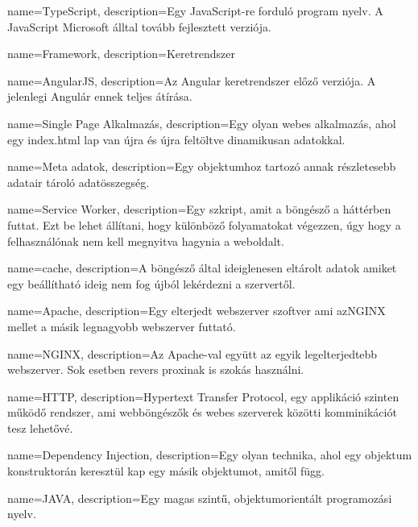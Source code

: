 {
        name=TypeScript,
        description={Egy JavaScript-re forduló program nyelv. A JavaScript Microsoft álltal tovább fejlesztett verziója.}
}

{
        name=Framework,
        description={Keretrendszer}
}

{
        name=AngularJS,
        description={Az Angular keretrendszer előző verziója. A jelenlegi Angulár ennek teljes átírása.}
}

{
        name=Single Page Alkalmazás,
        description={Egy olyan webes alkalmazás, ahol egy index.html lap van újra és újra feltöltve dinamikusan adatokkal.}
}

{
        name=Meta adatok,
        description={Egy objektumhoz tartozó annak  részletesebb adatair tároló adatösszegség.}
}

{
        name=Service Worker,
        description={Egy szkript, amit a böngésző a háttérben futtat. 
        Ezt be lehet állítani, hogy különböző folyamatokat végezzen, úgy hogy a felhasználónak nem kell megnyitva hagynia a weboldalt.}
}

{
        name=cache,
        description={A böngésző által ideiglenesen eltárolt adatok amiket egy beállítható ideig nem fog újból lekérdezni a szervertől.}
}

{
        name=Apache,
        description={Egy elterjedt webszerver szoftver ami az\Gls{NGINX} mellet a másik legnagyobb webszerver futtató.}
}

{
        name=NGINX,
        description={Az \Gls{Apache}-val együtt az egyik legelterjedtebb webszerver. Sok esetben revers proxinak is szokás használni.}
}

{
        name=HTTP,
        description={Hypertext Transfer Protocol, egy applikáció szinten működő rendszer, ami webböngészők és webes szerverek közötti komminikációt tesz lehetővé.}
}

{
        name=Dependency Injection,
        description={Egy olyan technika, ahol egy objektum konstruktorán keresztül kap egy másik objektumot, amitől függ.}
}

{
        name=JAVA,
        description={Egy magas szintű, objektumorientált programozási nyelv.}
}

